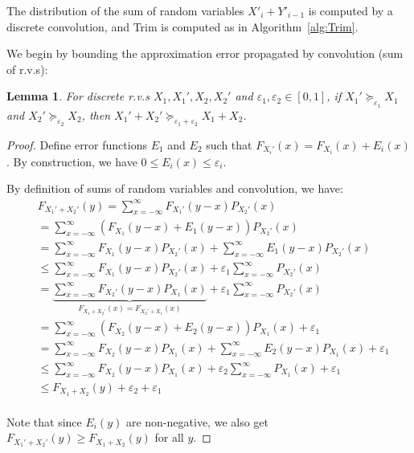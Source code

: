 \documentclass{article}
\newtheorem{lemma}{Lemma}
\begin{document}
The distribution of the sum of random variables $X'_i + Y'_{i-1}$ is 
computed by a discrete convolution, and Trim is computed as in Algorithm~\ref{alg:Trim}.

We begin by bounding the approximation error propagated by convolution (sum of r.v.s):

\begin{lemma} \label{Convolv}
For discrete r.v.s $X_1,X_1',X_2,X_2'$ and $\varepsilon_1,\varepsilon_2 \in [0,1]$, 
if $X_1'\succeq_{\varepsilon_1} X_1$ and  $X_2'\succeq_{\varepsilon_2} X_2$,
then $X_1'+X_2'\succeq_{\varepsilon_1+\varepsilon_2} X_1+X_2$.
\end{lemma}

\begin{proof}
Define error functions $E_1$ and $E_2$ such that 
$F_{X_i'}(x) = F_{X_i}(x)+ E_i(x)$. By construction, we have $ 0 \leq E_i(x) \leq \varepsilon_i$.

By definition of sums of random variables and convolution, we have:
\begin{align*}
& F_{X_1'+X_2'}(y) = \sum_{x=-\infty}^{\infty}F_{X_1'}(y-x)P_{X_2'}(x)\\
&=\sum_{x=-\infty}^{\infty}(F_{X_1}(y-x)+E_1(y-x))P_{X_2'}(x)\\
&= \sum_{x=-\infty}^{\infty}F_{X_1}(y-x)P_{X_2'}(x)+\sum_{x=-\infty}^{\infty}E_1(y-x)P_{X_2'}(x)\\
&\leq\sum_{x=-\infty}^{\infty}F_{X_1}(y-x)P_{X_2'}(x)+\varepsilon_1\sum_{x=-\infty}^{\infty}P_{X_2'}(x)\\
&=\underbrace{\sum_{x=-\infty}^{\infty}F_{X_2'}(y-x)P_{X_1}(x)}_{F_{X_1+X_2'}(x)=F_{X_2'+X_1}(x)}+\varepsilon_1\sum_{x=-\infty}^{\infty}P_{X_2'}(x)\\
&=\sum_{x=-\infty}^{\infty}(F_{X_2}(y-x)+E_2(y-x))P_{X_1}(x) + \varepsilon_1\\
&=\sum_{x=-\infty}^{\infty}F_{X_2}(y-x)P_{X_1}(x)+\sum_{x=-\infty}^{\infty}E_2(y-x)P_{X_1}(x) + \varepsilon_1\\
&\leq\sum_{x=-\infty}^{\infty}F_{X_2}(y-x)P_{X_1}(x)+\varepsilon_2\sum_{x=-\infty}^{\infty}P_{X_1}(x) + \varepsilon_1\\
&\leq F_{X_1+X_2}(y)+\varepsilon_2 + \varepsilon_1\\
\end{align*}

Note that since $E_i(y)$ are non-negative, we also get $F_{X_1'+X_2'}(y) \geq F_{X_1+X_2}(y)$ for all $y$.

\end{proof}
\end{document}
